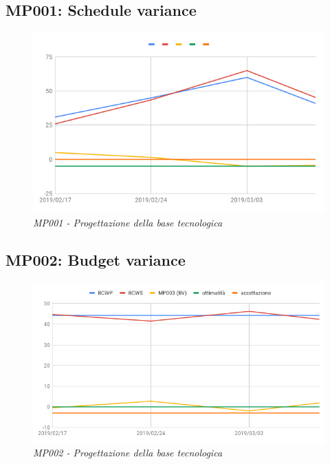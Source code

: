 \subsection{MP001: Schedule variance}
\begin{figure} [h]
    \centering
	\includegraphics[scale=0.5]{./images/svP.png}
	\caption{\textit{MP001 - Progettazione della base tecnologica}}\label{}
\end{figure}
\pagebreak
\subsection{MP002: Budget variance}
\begin{figure} [h]
    \centering
	\includegraphics[scale=0.5]{./images/bvP.png}
	\caption{\textit{MP002 - Progettazione della base tecnologica}}\label{}
\end{figure}

